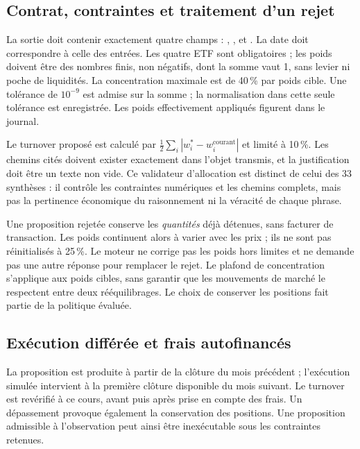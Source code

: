 \subsection{Contrat, contraintes et traitement d'un rejet}

La sortie doit contenir exactement quatre champs : , ,  et . La date doit correspondre à celle des entrées. Les quatre ETF sont obligatoires ; les poids doivent être des nombres finis, non négatifs, dont la somme vaut 1, sans levier ni poche de liquidités. La concentration maximale est de 40\,\% par poids cible. Une tolérance de $10^{-9}$ est admise sur la somme ; la normalisation dans cette seule tolérance est enregistrée. Les poids effectivement appliqués figurent dans le journal.

Le turnover proposé est calculé par $\frac{1}{2}\sum_i|w_i^*-w_i^{\mathrm{courant}}|$ et limité à 10\,\%. Les chemins cités doivent exister exactement dans l'objet transmis, et la justification doit être un texte non vide. Ce validateur d'allocation est distinct de celui des 33 synthèses : il contrôle les contraintes numériques et les chemins complets, mais pas la pertinence économique du raisonnement ni la véracité de chaque phrase.

Une proposition rejetée conserve les \emph{quantités} déjà détenues, sans facturer de transaction. Les poids continuent alors à varier avec les prix ; ils ne sont pas réinitialisés à 25\,\%. Le moteur ne corrige pas les poids hors limites et ne demande pas une autre réponse pour remplacer le rejet. Le plafond de concentration s'applique aux poids cibles, sans garantir que les mouvements de marché le respectent entre deux rééquilibrages. Le choix de conserver les positions fait partie de la politique évaluée.

\subsection{Exécution différée et frais autofinancés}

La proposition est produite à partir de la clôture du mois précédent ; l'exécution simulée intervient à la première clôture disponible du mois suivant. Le turnover est revérifié à ce cours, avant puis après prise en compte des frais. Un dépassement provoque également la conservation des positions. Une proposition admissible à l'observation peut ainsi être inexécutable sous les contraintes retenues.

